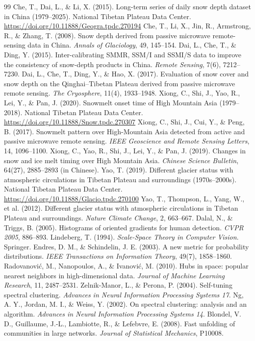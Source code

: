 \documentclass[11pt]{article}
\begin{document}
\renewcommand{\refname}{}
\vspace{-2.5em}
\begin{thebibliography}{99}\small\setlength\itemsep{0.1em}
 Che, T., Dai, L., \& Li, X. (2015). Long-term series of daily snow depth dataset in China (1979--2025). National Tibetan Plateau Data Center. \url{https://doi.org/10.11888/Geogra.tpdc.270194}
 Che, T., Li, X., Jin, R., Armstrong, R., \& Zhang, T. (2008). Snow depth derived from passive microwave remote-sensing data in China. \emph{Annals of Glaciology}, 49, 145--154.
 Dai, L., Che, T., \& Ding, Y. (2015). Inter-calibrating SMMR, SSM/I and SSMI/S data to improve the consistency of snow-depth products in China. \emph{Remote Sensing}, 7(6), 7212--7230.
 Dai, L., Che, T., Ding, Y., \& Hao, X. (2017). Evaluation of snow cover and snow depth on the Qinghai--Tibetan Plateau derived from passive microwave remote sensing. \emph{The Cryosphere}, 11(4), 1933--1948.
 Xiong, C., Shi, J., Yao, R., Lei, Y., \& Pan, J. (2020). Snowmelt onset time of High Mountain Asia (1979--2018). National Tibetan Plateau Data Center. \url{https://doi.org/10.11888/Snow.tpdc.270307}
 Xiong, C., Shi, J., Cui, Y., \& Peng, B. (2017). Snowmelt pattern over High-Mountain Asia detected from active and passive microwave remote sensing. \emph{IEEE Geoscience and Remote Sensing Letters}, 14, 1096--1100.
 Xiong, C., Yao, R., Shi, J., Lei, Y., \& Pan, J. (2019). Changes in snow and ice melt timing over High Mountain Asia. \emph{Chinese Science Bulletin}, 64(27), 2885--2893 (in Chinese).
 Yao, T. (2019). Different glacier status with atmospheric circulations in Tibetan Plateau and surroundings (1970s--2000s). National Tibetan Plateau Data Center. \url{https://doi.org/10.11888/Glacio.tpdc.270100}
 Yao, T., Thompson, L., Yang, W., et al. (2012). Different glacier status with atmospheric circulations in Tibetan Plateau and surroundings. \emph{Nature Climate Change}, 2, 663--667.
 Dalal, N., \& Triggs, B. (2005). Histograms of oriented gradients for human detection. \emph{CVPR 2005}, 886--893.
 Lindeberg, T. (1994). \emph{Scale-Space Theory in Computer Vision}. Springer.
 Endres, D. M., \& Schindelin, J. E. (2003). A new metric for probability distributions. \emph{IEEE Transactions on Information Theory}, 49(7), 1858--1860.
 Radovanovi\'c, M., Nanopoulos, A., \& Ivanovi\'c, M. (2010). Hubs in space: popular nearest neighbors in high-dimensional data. \emph{Journal of Machine Learning Research}, 11, 2487--2531.
 Zelnik-Manor, L., \& Perona, P. (2004). Self-tuning spectral clustering. \emph{Advances in Neural Information Processing Systems 17}.
 Ng, A. Y., Jordan, M. I., \& Weiss, Y. (2002). On spectral clustering: analysis and an algorithm. \emph{Advances in Neural Information Processing Systems 14}.
 Blondel, V. D., Guillaume, J.-L., Lambiotte, R., \& Lefebvre, E. (2008). Fast unfolding of communities in large networks. \emph{Journal of Statistical Mechanics}, P10008.
\end{thebibliography}
\end{document}
